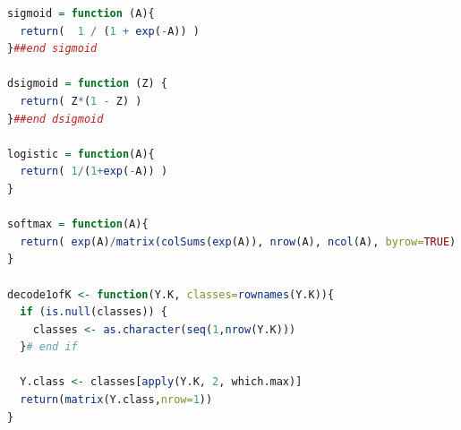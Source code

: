 \begin{lstlisting}[language=R,
caption={ฟังชั่น \texttt{sigmoid}, \texttt{dsigmoid}, \texttt{logistic}, \texttt{softmax}, และ \texttt{decode1ofK}},
label={lst: deep DNN09 others}]
sigmoid = function (A){
  return(  1 / (1 + exp(-A)) )
}##end sigmoid

dsigmoid = function (Z) {
  return( Z*(1 - Z) )
}##end dsigmoid

logistic = function(A){
  return( 1/(1+exp(-A)) )
}

softmax = function(A){
  return( exp(A)/matrix(colSums(exp(A)), nrow(A), ncol(A), byrow=TRUE) )
}

decode1ofK <- function(Y.K, classes=rownames(Y.K)){
  if (is.null(classes)) {
    classes <- as.character(seq(1,nrow(Y.K)))
  }# end if

  Y.class <- classes[apply(Y.K, 2, which.max)]
  return(matrix(Y.class,nrow=1))
}
\end{lstlisting}








